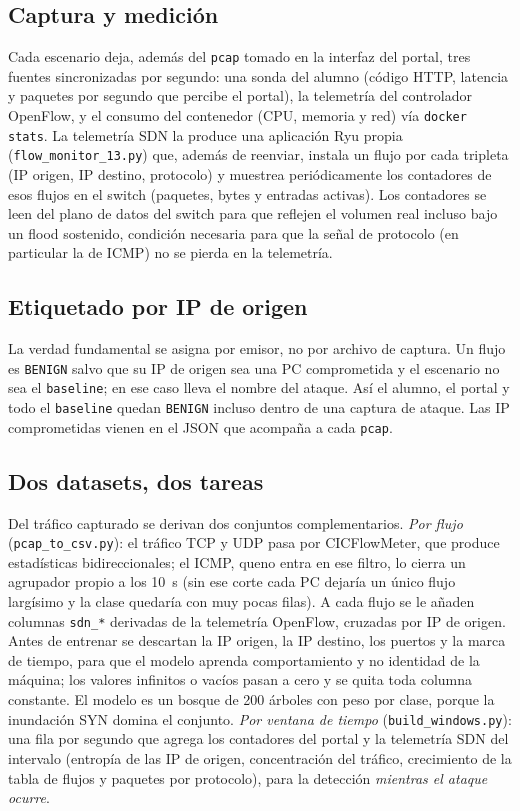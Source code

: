 \documentclass[a4paper,fleqn]{cas-dc}
\begin{document}
\subsection{Captura y medición}
Cada escenario deja, además del \texttt{pcap} tomado en la interfaz del portal, tres fuentes sincronizadas por segundo: una sonda del alumno (código HTTP, latencia y paquetes por segundo que percibe el portal), la telemetría del controlador OpenFlow, y el consumo del contenedor (CPU, memoria y red) vía \texttt{docker stats}. La telemetría SDN la produce una aplicación Ryu propia (\texttt{flow\_monitor\_13.py}) que, además de reenviar, instala un flujo por cada tripleta (IP origen, IP destino, protocolo) y muestrea periódicamente los contadores de esos flujos en el switch (paquetes, bytes y entradas activas). Los contadores se leen del plano de datos del switch para que reflejen el volumen real incluso bajo un flood sostenido, condición necesaria para que la señal de protocolo (en
particular la de ICMP) no se pierda en la telemetría.

\subsection{Etiquetado por IP de origen}
La verdad fundamental se asigna por emisor, no por archivo de captura. Un flujo es \texttt{BENIGN} salvo que su IP de origen sea una PC comprometida y el escenario no sea el \texttt{baseline}; en ese caso lleva el nombre del ataque. Así el alumno, el portal y todo el \texttt{baseline} quedan \texttt{BENIGN} incluso dentro de una captura de ataque. Las IP comprometidas vienen en el JSON que acompa\~na a cada \texttt{pcap}.

\subsection{Dos datasets, dos tareas}
Del tráfico capturado se derivan dos conjuntos complementarios. \emph{Por flujo} (\texttt{pcap\_to\_csv.py}): el tráfico TCP y UDP pasa por CICFlowMeter, que produce estadísticas bidireccionales; el ICMP, queno entra en ese filtro, lo cierra un agrupador propio a los 10~s (sin ese corte cada PC dejaría un único flujo largísimo y la clase quedaría con muy pocas filas). A cada flujo se le a\~naden columnas \texttt{sdn\_*} derivadas de la telemetría OpenFlow, cruzadas por IP de origen. Antes de entrenar se descartan la IP origen, la IP destino, los puertos y la marca de tiempo, para que el modelo aprenda comportamiento y no identidad de la máquina; los valores infinitos o vacíos pasan a cero y se quita toda columna constante. El modelo es un bosque de 200 árboles con peso por clase, porque la inundación SYN domina el conjunto. \emph{Por ventana de tiempo} (\texttt{build\_windows.py}): una fila por segundo que agrega los contadores del portal y la telemetría SDN del intervalo (entropía de las IP de origen, concentración del tráfico, crecimiento de la tabla de flujos y paquetes por protocolo), para la detección \emph{mientras el ataque ocurre}.
\end{document}
